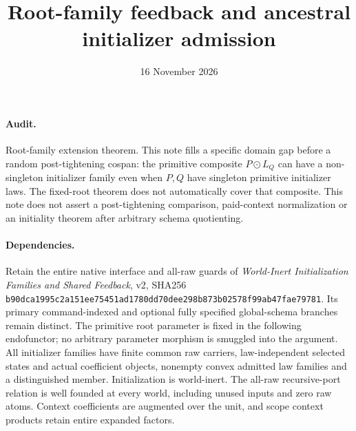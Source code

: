 \documentclass[11pt]{article}
\title{Root-family feedback and ancestral initializer admission}
\date{16 November 2026}
\begin{document}
\maketitle
\paragraph{Audit.} Root-family extension theorem. This note fills a specific domain gap before a random post-tightening cospan: the primitive composite $P\odot L_Q$ can have a non-singleton initializer family even when $P,Q$ have singleton primitive initializer laws. The fixed-root theorem does not automatically cover that composite. This note does not assert a post-tightening comparison, paid-context normalization or an initiality theorem after arbitrary schema quotienting.

\paragraph{Dependencies.} Retain the entire native interface and all-raw guards of \emph{World-Inert Initialization Families and Shared Feedback}, v2, SHA256
\texttt{b90dca1995c2a151ee75451ad1780dd70dee298b873b02578f99ab47fae79781}.
Its primary command-indexed and optional fully specified global-schema branches remain distinct. The primitive root parameter is fixed in the following endofunctor; no arbitrary parameter morphism is smuggled into the argument. All initializer families have finite common raw carriers, law-independent selected states and actual coefficient objects, nonempty convex admitted law families and a distinguished member. Initialization is world-inert. The all-raw recursive-port relation is well founded at every world, including unused inputs and zero raw atoms. Context coefficients are augmented over the unit, and scope context products retain entire expanded factors.
\end{document}
